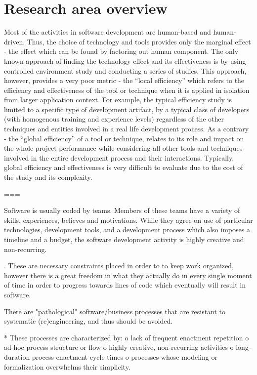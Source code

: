 \section{Research area overview}
Most of the activities in software development are human-based and human-driven. Thus, the choice 
of technology and tools provides only the marginal effect - the effect which can be found by 
factoring out human component. The only known approach of finding the technology effect and 
its effectiveness is by using controlled environment study and conducting a series of studies. 
This approach, however, provides a very poor metric - the ``local efficiency'' which refers to 
the efficiency and effectiveness of the tool or technique when it is applied in isolation 
from larger application context. 
For example, the typical efficiency study is limited to a specific type of development 
artifact, by a typical class of developers (with homogenous training and experience levels) 
regardless of the other techniques and entities involved in a real life development process. 
As a contrary  - the ``global efficiency'' of a tool or technique, relates to its role and 
impact on the whole project performance while considering all other tools and techniques 
involved in the entire development process and their interactions. Typically, global efficiency 
and effectiveness is very difficult to evaluate due to the cost of the study and its complexity.

===

Software is usually coded by teams. Members of these teams have a variety of skills, experiences, 
believes and motivations. While they agree on use of particular technologies, development tools, 
and a development process which also imposes a timeline and a budget, the software development
activity is highly creative and non-recurring. 

. These are necessary constraints placed in order to to keep work organized, 
however there is a great freedom in what they actually do in every single moment of time in 
order to progress towards lines of code which eventually will result in software. 

There are "pathological" software/business processes that are resistant to systematic (re)engineering, and thus should be avoided.

    * These processes are characterized by:
          o lack of frequent enactment repetition
          o ad-hoc process structure or flow
          o highly creative, non-recurring activities
          o long-duration process enactment cycle times
          o processes whose modeling or formalization overwhelms their simplicity.

